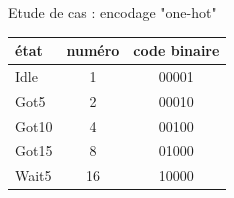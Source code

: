 \documentclass[xcolor=table]{beamer}
\begin{document}
\begin{frame}{Etude de cas : encodage "one-hot"}
\begin{minipage}{0.4\textwidth}
\begin{table}[!htbp]
      \begin{tabular}{|l|c|c|}
            \hline
            état  & numéro & code binaire  \\ \hline \hline
            Idle  & 1       & 00001           \\ \hline
            Got5  & 2       & 00010           \\ \hline
            Got10 & 4       & 00100           \\ \hline
            Got15 & 8       & 01000           \\ \hline
            Wait5 & 16      & 10000           \\ \hline
        \end{tabular}
    \end{table}
  \end{minipage}
\end{frame}
\end{document}
